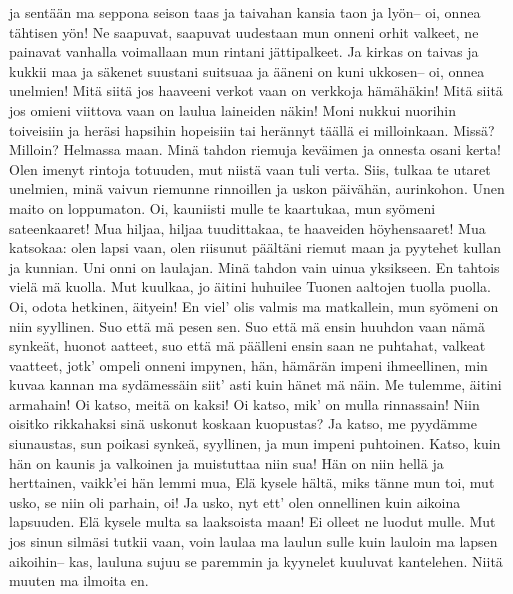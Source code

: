     ja sentään ma seppona seison taas
    ja taivahan kansia taon ja lyön--
    oi, onnea tähtisen yön!
  \endverse
  \beginverse
    Ne saapuvat, saapuvat uudestaan
    mun onneni orhit valkeet,
    ne painavat vanhalla voimallaan
    mun rintani jättipalkeet.
    Ja kirkas on taivas ja kukkii maa
    ja säkenet suustani suitsuaa
    ja ääneni on kuni ukkosen--
    oi, onnea unelmien!
  \endverse
  \beginverse
    Mitä siitä jos haaveeni verkot vaan
    on verkkoja hämähäkin!
    Mitä siitä jos omieni viittova vaan
    on laulua laineiden näkin!
    Moni nukkui nuorihin toiveisiin
    ja heräsi hapsihin hopeisiin
    tai herännyt täällä ei milloinkaan.
    Missä? Milloin? Helmassa maan.
    Minä tahdon riemuja keväimen
    ja onnesta osani kerta!
    Olen imenyt rintoja totuuden,
    mut niistä vaan tuli verta.
    Siis, tulkaa te utaret unelmien,
    minä vaivun riemunne rinnoillen
    ja uskon päivähän, aurinkohon.
    Unen maito on loppumaton.
  \endverse
  \beginverse
    Oi, kauniisti mulle te kaartukaa,
    mun syömeni sateenkaaret!
    Mua hiljaa, hiljaa tuudittakaa,
    te haaveiden höyhensaaret!
    Mua katsokaa: olen lapsi vaan,
    olen riisunut päältäni riemut maan
    ja pyytehet kullan ja kunnian.
    Uni onni on laulajan.
  \endverse
  \beginverse
    Minä tahdon vain uinua yksikseen.
    En tahtois vielä mä kuolla.
    Mut kuulkaa, jo äitini huhuilee
    Tuonen aaltojen tuolla puolla.
    Oi, odota hetkinen, äityein!
    En viel' olis valmis ma matkallein,
    mun syömeni on niin syyllinen.
    Suo että mä pesen sen.
  \endverse
  \beginverse
    Suo että mä ensin huuhdon vaan
    nämä synkeät, huonot aatteet,
    suo että mä päälleni ensin saan
    ne puhtahat, valkeat vaatteet,
    jotk' ompeli onneni impynen,
    hän, hämärän impeni ihmeellinen,
    min kuvaa kannan ma sydämessäin
    siit' asti kuin hänet mä näin.
  \endverse
  \beginverse
    Me tulemme, äitini armahain!
    Oi katso, meitä on kaksi!
    Oi katso, mik' on mulla rinnassain!
    Niin oisitko rikkahaksi
    sinä uskonut koskaan kuopustas?
    Ja katso, me pyydämme siunaustas,
    sun poikasi synkeä, syyllinen,
    ja mun impeni puhtoinen.
  \endverse
  \beginverse
    Katso, kuin hän on kaunis ja valkoinen
    ja muistuttaa niin sua!
    Hän on niin hellä ja herttainen,
    vaikk'ei hän lemmi mua,
    Elä kysele hältä, miks tänne mun toi,
    mut usko, se niin oli parhain, oi!
    Ja usko, nyt ett' olen onnellinen
    kuin aikoina lapsuuden.
  \endverse
  \beginverse
    Elä kysele multa sa laaksoista maan!
    Ei olleet ne luodut mulle.
    Mut jos sinun silmäsi tutkii vaan,
    voin laulaa ma laulun sulle
    kuin lauloin ma lapsen aikoihin--
    kas, lauluna sujuu se paremmin
    ja kyynelet kuuluvat kantelehen.
    Niitä muuten ma ilmoita en.
  \endverse
\endsong


